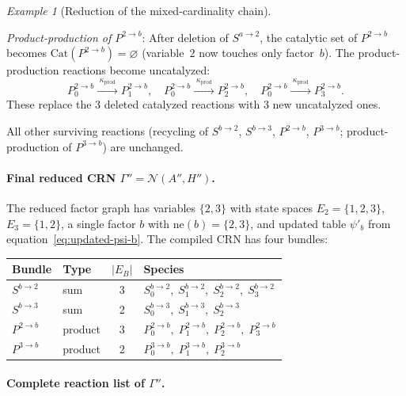 \documentclass{article}
\theoremstyle{plain}
\theoremstyle{definition}
\theoremstyle{remark}
\newtheorem{example}{Example}[section]
\newcommand{\<}{\langle}
\renewcommand{\>}{\rangle}
\begin{document}
\begin{example}[Reduction of the mixed-cardinality chain]
\begin{itemize}
  \emph{Product-production of $P^{2\to b}$}:
  After deletion of $S^{a\to 2}$, the catalytic set of $P^{2\to b}$
  becomes $\mathrm{Cat}(P^{2\to b})=\varnothing$
  (variable~$2$ now touches only factor~$b$).
  The product-production reactions become uncatalyzed:
  \[
  P^{2\to b}_0 \xrightarrow{\;\kappa_{\mathrm{prod}}\;} P^{2\to b}_1,
  \quad
  P^{2\to b}_0 \xrightarrow{\;\kappa_{\mathrm{prod}}\;} P^{2\to b}_2,
  \quad
  P^{2\to b}_0 \xrightarrow{\;\kappa_{\mathrm{prod}}\;} P^{2\to b}_3.
  \]
  These replace the 3 deleted catalyzed reactions with 3 new uncatalyzed ones.
 
  All other surviving reactions (recycling of $S^{b\to 2}$, $S^{b\to 3}$,
  $P^{2\to b}$, $P^{3\to b}$; product-production of $P^{3\to b}$)
  are unchanged.
\end{itemize}
 
 
\paragraph{Final reduced CRN $\Gamma''=\mathcal{N}(A'',H'')$.}
 
The reduced factor graph has variables $\{2,3\}$ with state spaces
$E_2=\{1,2,3\}$, $E_3=\{1,2\}$, a single factor $b$ with
$\mathrm{ne}(b)=\{2,3\}$, and updated table $\psi'_b$ from
equation~\eqref{eq:updated-psi-b}.
The compiled CRN has four bundles:
 
\begin{center}
\renewcommand{\arraystretch}{1.15}
\begin{tabular}{@{}llcl@{}}
\toprule
Bundle & Type & $|E_B|$ & Species \\
\midrule
$S^{b\to 2}$ & sum     & 3 & $S^{b\to 2}_0,\; S^{b\to 2}_1,\; S^{b\to 2}_2,\; S^{b\to 2}_3$ \\
$S^{b\to 3}$ & sum     & 2 & $S^{b\to 3}_0,\; S^{b\to 3}_1,\; S^{b\to 3}_2$ \\[3pt]
$P^{2\to b}$ & product & 3 & $P^{2\to b}_0,\; P^{2\to b}_1,\; P^{2\to b}_2,\; P^{2\to b}_3$ \\
$P^{3\to b}$ & product & 2 & $P^{3\to b}_0,\; P^{3\to b}_1,\; P^{3\to b}_2$ \\
\bottomrule
\end{tabular}
\end{center}
 
\paragraph{Complete reaction list of $\Gamma''$.}
 

\end{example}
\end{document}
